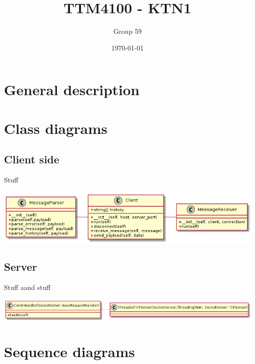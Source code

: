 \documentclass[11pt]{article}
\author{Group 59}
\date{\today}
\title{TTM4100 - KTN1}
\begin{document}
\maketitle
\tableofcontents



\section{General description}
\label{sec-1}

\section{Class diagrams}
\label{sec-2}
\subsection{Client side}
\label{sec-2-1}
Stuff

\includegraphics[width=.9\linewidth]{client_class.png}
\subsection{Server}
\label{sec-2-2}
Stuff aand stuff

\includegraphics[width=.9\linewidth]{server_class.png}

\section{Sequence diagrams}
\label{sec-3}
\end{document}
